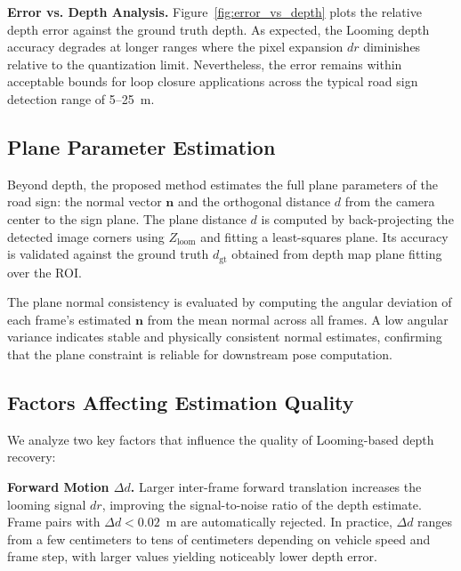 \documentclass[runningheads]{llncs}
\begin{document}
\noindent\textbf{Error vs. Depth Analysis.}
Figure~\ref{fig:error_vs_depth} plots the relative depth error against the ground truth
depth. As expected, the Looming depth accuracy degrades at longer ranges where the
pixel expansion $dr$ diminishes relative to the quantization limit. Nevertheless, the
error remains within acceptable bounds for loop closure applications across the typical
road sign detection range of 5--25~m.

\subsection{Plane Parameter Estimation}

Beyond depth, the proposed method estimates the full plane parameters of the road sign:
the normal vector $\mathbf{n}$ and the orthogonal distance $d$ from the camera center
to the sign plane. The plane distance $d$ is computed by back-projecting the detected
image corners using $Z_{\text{loom}}$ and fitting a least-squares plane. Its accuracy
is validated against the ground truth $d_{\text{gt}}$ obtained from depth map plane
fitting over the ROI.

The plane normal consistency is evaluated by computing the angular deviation of each
frame’s estimated $\mathbf{n}$ from the mean normal across all frames. A low angular
variance indicates stable and physically consistent normal estimates, confirming that
the plane constraint is reliable for downstream pose computation.


\subsection{Factors Affecting Estimation Quality}

We analyze two key factors that influence the quality of Looming-based depth recovery:

\noindent\textbf{Forward Motion $\Delta d$.}
Larger inter-frame forward translation increases the looming signal $dr$, improving the
signal-to-noise ratio of the depth estimate. Frame pairs with $\Delta d < 0.02$~m are
automatically rejected. In practice, $\Delta d$ ranges from a few centimeters to tens
of centimeters depending on vehicle speed and frame step, with larger values yielding
noticeably lower depth error.
\end{document}
